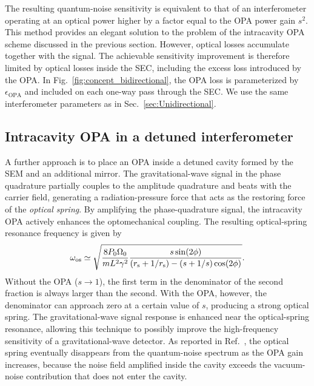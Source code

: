 \documentclass{iopjournal}
\begin{document}
The resulting quantum-noise sensitivity is equivalent to that of an interferometer operating at an optical power higher by a factor equal to the OPA power gain \(s^2\).
This method provides an elegant solution to the problem of the intracavity OPA scheme discussed in the previous section. 
However, optical losses accumulate together with the signal.
The achievable sensitivity improvement is therefore limited by optical losses inside the SEC, including the excess loss introduced by the OPA. 
In Fig.~\ref{fig:concept_bidirectional}, the OPA loss is parameterized by \(\epsilon_{\mathrm{OPA}}\) and included on each one-way pass through the SEC. 
We use the same interferometer parameters as in Sec.~\ref{sec:Unidirectional}.

\subsection{Intracavity OPA in a detuned interferometer}

A further approach is to place an OPA inside a detuned cavity formed by the SEM and an additional mirror. The gravitational-wave signal in the phase quadrature partially couples to the amplitude quadrature and beats with the carrier field, generating a radiation-pressure force that acts as the restoring force of the {\it optical spring}. By amplifying the phase-quadrature signal, the intracavity OPA actively enhances the optomechanical coupling. The resulting optical-spring resonance frequency is given by
\begin{align}
    \omega_{\rm os}
    \simeq
    \sqrt{
    \frac{8P_0\Omega_0}{mL^2\gamma^2}
    \frac{
    s\sin(2\phi)
    }{
    (r_{\rm s}+1/r_{\rm s})
    -(s+1/s)\cos(2\phi)
    }}.\label{eq:optical_resonance}
\end{align}
Without the OPA (\(s\rightarrow1\)), the first term in the denominator of the second fraction is always larger than the second. With the OPA, however, the denominator can approach zero at a certain value of \(s\), producing a strong optical spring. The gravitational-wave signal response is enhanced near the optical-spring resonance, allowing this technique to possibly improve the high-frequency sensitivity of a gravitational-wave detector. As reported in Ref.~\cite{Somiya2023IntracavitySignalAmplification}, the optical spring eventually disappears from the quantum-noise spectrum as the OPA gain increases, because the noise field amplified inside the cavity exceeds the vacuum-noise contribution that does not enter the cavity.
\end{document}

